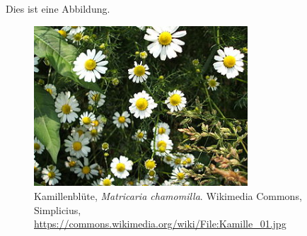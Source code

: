 

Dies ist eine Abbildung.

\begin{figure}[htb]
    \centering
    \includegraphics[height=6cm]{320px-Kamille_01.jpg}
    \caption{Kamillenblüte, \emph{Matricaria chamomilla}. Wikimedia Commons, Simplicius, \url{https://commons.wikimedia.org/wiki/File:Kamille_01.jpg}}
    \label{kamille}
\end{figure}
